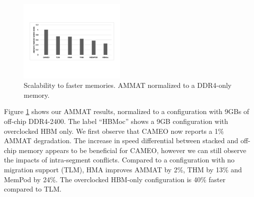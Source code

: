 \begin{figure}[h]
  \includegraphics[width=0.46\textwidth]{figures/revised/new/scalability_speed.pdf}
  \caption{Scalability to faster memories. AMMAT normalized to a DDR4-only memory.}
  \label{fig:scalability}
\end{figure}

Figure \ref{fig:scalability} shows our AMMAT results, normalized to a configuration with 9GBs of off-chip DDR4-2400. The label ``HBMoc'' shows a 9GB configuration with overclocked HBM only. We first observe that CAMEO now reports a 1\% AMMAT degradation. The increase in speed differential between stacked and off-chip memory appears to be beneficial for CAMEO, however we can still observe the impacts of intra-segment conflicts. Compared to a configuration with no migration support (TLM), HMA improves AMMAT by 2\%, THM by 13\% and MemPod by 24\%. The overclocked HBM-only configuration is 40\% faster compared to TLM.

